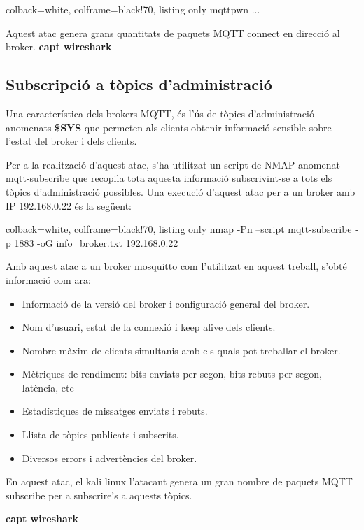 \begin{tcblisting}{colback=white, colframe=black!70, listing only}
mqttpwn ...
\end{tcblisting}

Aquest atac genera grans quantitats de paquets MQTT connect en direcció al broker. 
\textbf{capt wireshark}



\subsection{Subscripció a tòpics d'administració}

Una característica dels brokers MQTT, és l'ús de tòpics d'administració anomenats \textbf{\$SYS} que permeten als clients obtenir informació sensible sobre l'estat del broker i dels clients.

Per a la realització d'aquest atac, s'ha utilitzat un script de NMAP anomenat mqtt-subscribe que recopila tota aquesta informació subscrivint-se a tots els tòpics d'administració possibles. 
Una execució d'aquest atac per a un broker amb IP 192.168.0.22 és la següent:

\begin{tcblisting}{colback=white, colframe=black!70, listing only}
    nmap -Pn --script mqtt-subscribe -p 1883 -oG info_broker.txt 192.168.0.22
\end{tcblisting}

Amb aquest atac a un broker mosquitto com l'utilitzat en aquest treball, s'obté informació com ara:

\begin{itemize}
    \item Informació de la versió del broker i configuració general del broker.
    \item Nom d'usuari, estat de la connexió i keep alive dels clients.
    \item Nombre màxim de clients simultanis amb els quals pot treballar el broker.
    \item Mètriques de rendiment: bits enviats per segon, bits rebuts per segon, latència, etc
    \item Estadístiques de missatges enviats i rebuts.
    \item Llista de tòpics publicats i subscrits.
    \item Diversos errors i advertències del broker.
\end{itemize}

En aquest atac, el kali linux l'atacant genera un gran nombre de paquets MQTT subscribe per a subscrire's a aquests tòpics. 

\textbf{capt wireshark}

